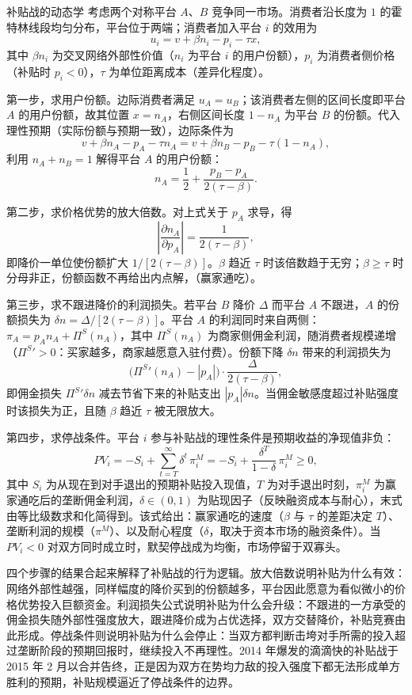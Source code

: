 \begin{derivation}{补贴战的动态学}{}
考虑两个对称平台 $A$、$B$ 竞争同一市场。消费者沿长度为 $1$ 的霍特林线段均匀分布，平台位于两端；消费者加入平台 $i$ 的效用为
\[
u_i = v + \beta n_i - p_i - \tau x,
\]
其中 $\beta n_i$ 为交叉网络外部性价值（$n_i$ 为平台 $i$ 的用户份额），$p_i$ 为消费者侧价格（补贴时 $p_i < 0$），$\tau$ 为单位距离成本（差异化程度）。

第一步，求用户份额。边际消费者满足 $u_A = u_B$；该消费者左侧的区间长度即平台 $A$ 的用户份额，故其位置 $x = n_A$，右侧区间长度 $1-n_A$ 为平台 $B$ 的份额。代入理性预期（实际份额与预期一致），边际条件为
\[
v + \beta n_A - p_A - \tau n_A = v + \beta n_B - p_B - \tau(1 - n_A),
\]
利用 $n_A + n_B = 1$ 解得平台 $A$ 的用户份额：
\[
n_A = \frac12 + \frac{p_B - p_A}{2(\tau - \beta)}.
\]

第二步，求价格优势的放大倍数。对上式关于 $p_A$ 求导，得
\[
\left|\frac{\partial n_A}{\partial p_A}\right| = \frac{1}{2(\tau-\beta)},
\]
即降价一单位使份额扩大 $1/[2(\tau-\beta)]$。$\beta$ 趋近 $\tau$ 时该倍数趋于无穷；$\beta \geq \tau$ 时分母非正，份额函数不再给出内点解，（赢家通吃）。

第三步，求不跟进降价的利润损失。若平台 $B$ 降价 $\Delta$ 而平台 $A$ 不跟进，$A$ 的份额损失为 $\delta n = \Delta/[2(\tau-\beta)]$。平台 $A$ 的利润同时来自两侧：$\pi_A = p_A n_A + \Pi^S(n_A)$，其中 $\Pi^S(n_A)$ 为商家侧佣金利润，随消费者规模递增（$\Pi^S{}' > 0$：买家越多，商家越愿意入驻付费）。份额下降 $\delta n$ 带来的利润损失为
\[
\bigl(\Pi^S{}'(n_A) - |p_A|\bigr)\cdot\frac{\Delta}{2(\tau-\beta)},
\]
即佣金损失 $\Pi^S{}'\delta n$ 减去节省下来的补贴支出 $|p_A|\delta n$。当佣金敏感度超过补贴强度时该损失为正，且随 $\beta$ 趋近 $\tau$ 被无限放大。

第四步，求停战条件。平台 $i$ 参与补贴战的理性条件是预期收益的净现值非负：
\[
PV_i = -S_i + \sum_{t=T}^{\infty}\delta^t\,\pi^M_i = -S_i + \frac{\delta^T}{1-\delta}\,\pi^M_i \geq 0,
\]
其中 $S_i$ 为从现在到对手退出的预期补贴投入现值，$T$ 为对手退出时刻，$\pi^M_i$ 为赢家通吃后的垄断佣金利润，$\delta \in (0,1)$ 为贴现因子（反映融资成本与耐心），末式由等比级数求和化简得到。该式给出：赢家通吃的速度（$\beta$ 与 $\tau$ 的差距决定 $T$）、垄断利润的规模（$\pi^M$）、以及耐心程度（$\delta$，取决于资本市场的融资条件）。当 $PV_i < 0$ 对双方同时成立时，默契停战成为均衡，市场停留于双寡头。
\end{derivation}

四个步骤的结果合起来解释了补贴战的行为逻辑。放大倍数说明补贴为什么有效：网络外部性越强，同样幅度的降价买到的份额越多，平台因此愿意为看似微小的价格优势投入巨额资金。利润损失公式说明补贴为什么会升级：不跟进的一方承受的佣金损失随外部性强度放大，跟进降价成为占优选择，双方交替降价，补贴竞赛由此形成。停战条件则说明补贴为什么会停止：当双方都判断击垮对手所需的投入超过垄断阶段的预期回报时，继续投入不再理性。2014 年爆发的滴滴快的补贴战于 2015 年 2 月以合并告终，正是因为双方在势均力敌的投入强度下都无法形成单方胜利的预期，补贴规模逼近了停战条件的边界。

